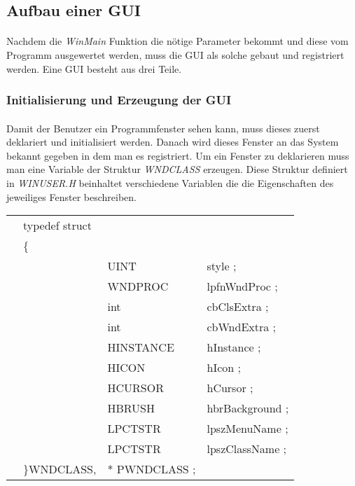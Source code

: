 \subsection{Aufbau einer GUI}
\paragraph{}
Nachdem die \textit{WinMain} Funktion die nötige Parameter bekommt und diese vom Programm ausgewertet werden, muss die GUI als solche gebaut und registriert werden. Eine GUI besteht aus drei Teile.


\subsubsection{Initialisierung und Erzeugung der GUI}
\paragraph{}
Damit der Benutzer ein Programmfenster sehen kann, muss dieses zuerst deklariert und initialisiert werden. Danach wird dieses Fenster an das System bekannt gegeben in dem man es registriert. Um ein Fenster zu deklarieren muss man eine Variable der Struktur \textit{WNDCLASS} erzeugen. Diese Struktur definiert in \textit{WINUSER.H} beinhaltet verschiedene Variablen die die Eigenschaften des jeweiliges Fenster beschreiben.



\begin{tabular}{llll}
& typedef struct\\
& \{\\
& & UINT        & style ;\\
& & WNDPROC     & lpfnWndProc ;\\
& & int         & cbClsExtra ;\\
& & int         & cbWndExtra ;\\
& & HINSTANCE   & hInstance ;\\
& & HICON       & hIcon ;\\
& & HCURSOR     & hCursor ;\\
& & HBRUSH      & hbrBackground ;\\
& & LPCTSTR     & lpszMenuName ;\\
& & LPCTSTR     & lpszClassName ;\\
&\}WNDCLASS,&* PWNDCLASS ;
\end{tabular}
\\


